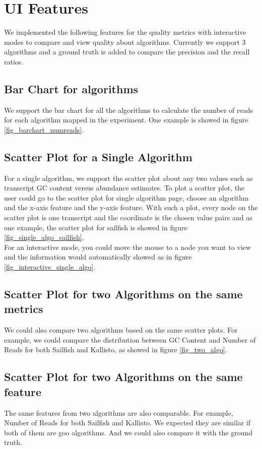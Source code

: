 \documentclass[11pt,letter]{article}
\begin{document}
\section {UI Features}
We implemented the following features for the quality metrics with interactive modes to compare and view quality about algorithms. Currently we support 3 algorithms and a ground truth is added to compare the precision and the recall ratios.
\subsection {Bar Chart for algorithms}
We support the bar chart for all the algorithms to calculate the number of reads for each algorithm mapped in the experiment. One example is showed in figure \ref{fig_barchart_numreads}.

\subsection {Scatter Plot for a Single Algorithm}
For a single algorithm, we support the scatter plot about any two values such as transcript GC content versus abundance estimates. To plot a scatter plot, the user could go to the scatter plot for single algorithm page, choose an algorithm and the x-axis feature and the y-axis feature. With such a plot, every node on the scatter plot is one transcript and the coordinate is the chosen value pairs and as one example, the scatter plot for sailfish is showed in figure \ref{fig_single_algo_sailfish}. \\
For an interactive mode, you could move the mouse to a node you want to view and the information would automatically showed as in figure \ref{fig_interactive_single_algo}.

\subsection {Scatter Plot for two Algorithms on the same metrics}
We could also compare two algorithms based on the same scatter plots. For example, we could compare the distribution between GC Content and Number of Reads for both Sailfish and Kallisto, as showed in figure \ref{fig_two_algo}.

\subsection {Scatter Plot for two Algorithms on the same feature}
The same features from two algorithms are also comparable. For example, Number of Reads for both Sailfish and Kallisto. We expected they are similar if both of them are goo algorithms. And we could also compare it with the ground truth.
\end{document}
